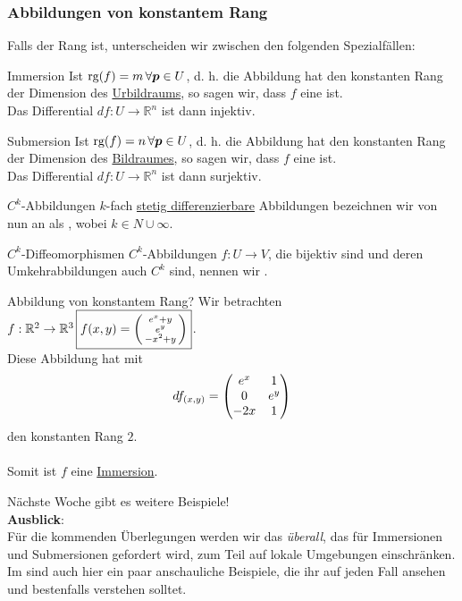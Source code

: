 \subsubsection{Abbildungen von konstantem Rang}
Falls der Rang  ist, unterscheiden wir zwischen den folgenden Spezialfällen:
\begin{Def}
{Immersion}
Ist $\text{rg}(f)=m\,\forall {{\text{\boldmath${p}$}}}\in U$, d. h. die Abbildung hat den konstanten Rang der Dimension des \underline{Urbildraums}, so sagen wir, dass $f$ eine  ist.\\
Das Differential $df:U\to\mathbb{R}^n$ ist dann injektiv. 
\end{Def}
\begin{Def}
{Submersion}
Ist $\text{rg}(f)=n\,\forall {{\text{\boldmath${p}$}}}\in U$, d. h. die Abbildung hat den konstanten Rang der Dimension des \underline{Bildraumes}, so sagen wir, dass $f$ eine  ist.\\
Das Differential $df:U\to\mathbb{R}^n$ ist dann surjektiv.
\end{Def}
\begin{Wiederholung}
{$C^k$-Abbildungen}
$k$-fach \underline{stetig differenzierbare} Abbildungen bezeichnen wir von nun an als , wobei $k\in N\cup\infty$.
\end{Wiederholung}
\begin{Def}
{$C^k$-Diffeomorphismen}
$C^k$-Abbildungen $f:U\to V$, die bijektiv sind und deren Umkehrabbildungen auch $C^k$ sind, nennen wir .
\end{Def}
\begin{Beispiel}
{Abbildung von konstantem Rang?}
Wir betrachten $f:\mathbb{R}^2\to\mathbb{R}^3\,\boxed{f(x,y)=\left(\begin{smallmatrix}e^x+y\\e^y\\-x^2+y\end{smallmatrix}\right)}$.\\
Diese Abbildung hat mit
\begin{equation*}
    df_{(x,y)}=\begin{pmatrix}e^x&1\\0&e^y\\-2x&1\end{pmatrix}
\end{equation*}
den konstanten Rang $2$.\\
\\
Somit ist $f$ eine \underline{Immersion}.
\end{Beispiel}
Nächste Woche gibt es weitere Beispiele!\\
\textbf{Ausblick}:\\
Für die kommenden Überlegungen werden wir das \textit{überall}, das für Immersionen und Submersionen gefordert wird, zum Teil auf lokale Umgebungen einschränken.\\
Im \Skript{} sind auch hier ein paar anschauliche Beispiele, die ihr auf jeden Fall ansehen und bestenfalls verstehen solltet.

